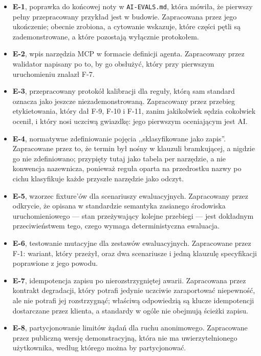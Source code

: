 \documentclass[11pt,a4paper]{article}
\begin{document}
\begin{itemize}[leftmargin=*]
    \item \textbf{E-1}, poprawka do końcowej noty w \texttt{AI-EVALS.md}, która
    mówiła, że pierwszy pełny przepracowany przykład jest w budowie. Zapracowana
    przez jego ukończenie; obecnie zrobiona, a cytowanie wskazuje, które części
    pętli są zademonstrowane, a które pozostają wyłącznie protokołem.
    \item \textbf{E-2}, wpis narzędzia MCP w formacie definicji agenta.
    Zapracowany przez walidator napisany po to, by go obsłużyć, który przy
    pierwszym uruchomieniu znalazł F-7.
    \item \textbf{E-3}, przepracowany protokół kalibracji dla reguły, którą sam
    standard oznacza jako jeszcze niezademonstrowaną. Zapracowany przez przebieg
    etykietowania, który dał F-9, F-10 i F-11, zanim jakikolwiek sędzia cokolwiek
    ocenił, i który nosi uczciwą gwiazdkę: jego pierwszym oceniającym jest AI.
    \item \textbf{E-4}, normatywne zdefiniowanie pojęcia ,,sklasyfikowane jako
    zapis''. Zapracowane przez to, że termin był nośny w klauzuli bramkującej, a
    nigdzie go nie zdefiniowano; przypięty tutaj jako tabela per narzędzie, a nie
    konwencja nazewnicza, ponieważ reguła oparta na przedrostku nazwy po cichu
    klasyfikuje każde przyszłe narzędzie jako odczyt.
    \item \textbf{E-5}, wzorzec fixture'ów dla scenariuszy ewaluacyjnych.
    Zapracowany przez odkrycie, że opisana w standardzie semantyka zasianego
    środowiska uruchomieniowego --- stan przeżywający kolejne przebiegi --- jest
    dokładnym przeciwieństwem tego, czego wymaga deterministyczna ewaluacja.
    \item \textbf{E-6}, testowanie mutacyjne dla zestawów ewaluacyjnych.
    Zapracowane przez F-1: wariant, który przeżył, oraz dwa scenariusze i jedną
    klauzulę specyfikacji poprawione z jego powodu.
    \item \textbf{E-7}, idempotencja zapisu po nierozstrzygniętej awarii.
    Zapracowana przez kontrakt degradacji, który potrafi jedynie uczciwie
    zaraportować niepewność, ale nie potrafi jej rozstrzygnąć; właściwą
    odpowiedzią są klucze idempotencji dostarczane przez klienta, a standardy w
    ogóle nie obejmują ścieżki zapisu.
    \item \textbf{E-8}, partycjonowanie limitów żądań dla ruchu anonimowego.
    Zapracowane przez publiczną wersję demonstracyjną, która nie ma
    uwierzytelnionego użytkownika, według którego można by partycjonować.
\end{itemize}
\end{document}
